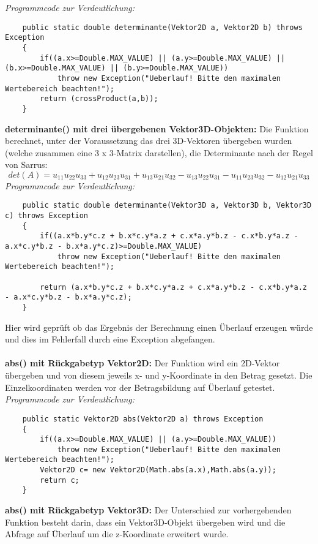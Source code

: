 \documentclass[a4paper,11pt]{scrartcl}
\begin{document}
\textit{Programmcode zur Verdeutlichung:}
\begin{lstlisting}
	public static double determinante(Vektor2D a, Vektor2D b) throws Exception
	{
		if((a.x>=Double.MAX_VALUE) || (a.y>=Double.MAX_VALUE) || (b.x>=Double.MAX_VALUE) || (b.y>=Double.MAX_VALUE))
			throw new Exception("Ueberlauf! Bitte den maximalen Wertebereich beachten!");
		return (crossProduct(a,b));
	}
\end{lstlisting} $\;$ \\
\textbf{determinante() mit drei übergebenen Vektor3D-Objekten:} Die Funktion  berechnet, unter der Voraussetzung das drei 3D-Vektoren übergeben wurden (welche zusammen eine 3 x 3-Matrix darstellen), die Determinante nach der Regel von Sarrus:
\[ det(A) = u_{11}u_{22}u_{33} + u_{12}u_{23}u_{31} + u_{13}u_{21}u_{32} - u_{13}u_{22}u_{31} - u_{11}u_{23}u_{32} - u_{12}u_{21}u_{33} \]
\textit{Programmcode zur Verdeutlichung:}
\begin{lstlisting}
	public static double determinante(Vektor3D a, Vektor3D b, Vektor3D c) throws Exception
	{
		if((a.x*b.y*c.z + b.x*c.y*a.z + c.x*a.y*b.z - c.x*b.y*a.z - a.x*c.y*b.z - b.x*a.y*c.z)>=Double.MAX_VALUE)
			throw new Exception("Ueberlauf! Bitte den maximalen Wertebereich beachten!");
		
		return (a.x*b.y*c.z + b.x*c.y*a.z + c.x*a.y*b.z - c.x*b.y*a.z - a.x*c.y*b.z - b.x*a.y*c.z);
	}
\end{lstlisting}
Hier wird geprüft ob das Ergebnis der Berechnung einen Überlauf erzeugen würde und dies im Fehlerfall durch eine Exception abgefangen.\\
\\
\textbf{abs() mit Rückgabetyp Vektor2D:} Der Funktion wird ein 2D-Vektor übergeben und von diesem jeweils x- und y-Koordinate in den Betrag gesetzt. Die Einzelkoordinaten werden vor der Betragsbildung auf Überlauf getestet.
\textit{Programmcode zur Verdeutlichung:}
\begin{lstlisting}
	public static Vektor2D abs(Vektor2D a) throws Exception
	{
		if((a.x>=Double.MAX_VALUE) || (a.y>=Double.MAX_VALUE))
			throw new Exception("Ueberlauf! Bitte den maximalen Wertebereich beachten!");
		Vektor2D c= new Vektor2D(Math.abs(a.x),Math.abs(a.y));
		return c;
	}
\end{lstlisting} $\;$ \\
\textbf{abs() mit Rückgabetyp Vektor3D:} Der Unterschied zur vorhergehenden Funktion besteht darin, dass ein Vektor3D-Objekt übergeben wird und die Abfrage auf Überlauf um die z-Koordinate erweitert wurde.\\
\end{document}
